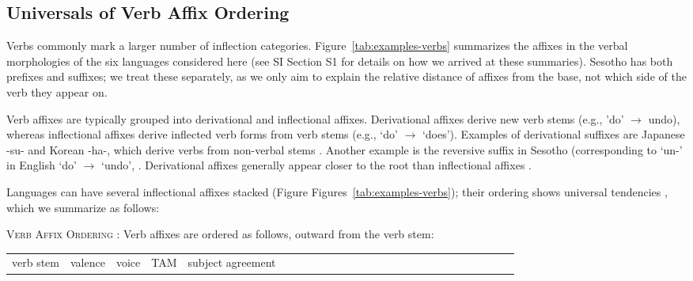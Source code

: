 \documentclass[11pt,letterpaper]{article}
\newcommand{\citep}{\parencite}
\begin{document}
\subsection{Universals of Verb Affix Ordering}\label{sec:univ-verbs}
Verbs commonly mark a larger number of inflection categories.
Figure~\ref{tab:examples-verbs} summarizes the affixes in the verbal morphologies of the six languages considered here (see SI Section S1 for details on how we arrived at these summaries).
Sesotho has both prefixes and suffixes; we treat these separately, as we only aim to explain the relative distance of affixes from the base, not which side of the verb they appear on.

Verb affixes are typically grouped into derivational and inflectional affixes.
Derivational affixes derive new verb stems (e.g., 'do' $\rightarrow$ undo), whereas inflectional affixes derive inflected verb forms from verb stems (e.g., `do' $\rightarrow$ `does').
Examples of derivational suffixes are Japanese -su- and Korean -ha-, which derive verbs from non-verbal stems \citep{hasegawa2014japanese, yeon2010korean}.
Another example is the reversive suffix in Sesotho (corresponding to `un-' in English `do' $\rightarrow$ `undo', \citep{doke1967textbook}.
Derivational affixes generally appear closer to the root than inflectional affixes \citep{greenberg-universals-1963}.

Languages can have several inflectional affixes stacked (Figure Figures~\ref{tab:examples-verbs}); their ordering shows universal tendencies \citep{bybee-morphology-1985}, which we summarize as follows:

\begin{adjustwidth}{6em}{6em}
\textsc{Verb Affix Ordering} \citep{bybee-morphology-1985}:
Verb affixes are ordered as follows, outward from the verb stem:

\begin{tabular}{llllllllllllllllllllllllll}
verb stem & valence & voice & TAM & subject agreement
\end{tabular}
\end{adjustwidth}
\end{document}

